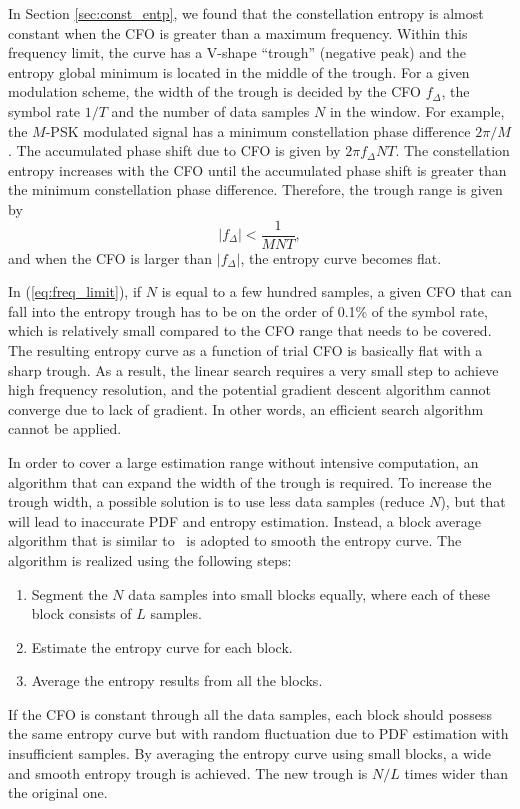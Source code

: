 \documentclass[journal,comsoc, onecolumn, 12pt,draftclsnofoot]{IEEEtran} %
\begin{document}
In Section \ref{sec:const_entp}, we found that the constellation entropy is almost constant when the CFO is greater than a maximum frequency.
Within this frequency limit, the curve has a V-shape ``trough'' (negative peak) and the entropy global minimum is located in the middle of the trough.
For a given modulation scheme, the width of the trough is decided by the CFO $f_\Delta$, the symbol rate $1/T$ and the number of data samples $N$ in the window.
For example, the \(M\)-PSK modulated signal has a minimum constellation phase difference \(2\pi/M\).
The accumulated phase shift due to CFO is given by \(2\pi f_\Delta N T\).
The constellation entropy increases with the CFO until the accumulated phase shift is greater than the minimum constellation phase difference. 
Therefore, the trough range is given by
\begin{equation}
\left| {f_\Delta } \right| < \frac{1}{{MNT}},
\label{eq:freq_limit}
\end{equation}
\noindent and when the CFO is larger than $\left| {f_\Delta } \right|$, the entropy curve becomes flat.


In (\ref{eq:freq_limit}), if \(N\) is equal to a few hundred samples, a given CFO that can fall into the entropy trough has to be on the order of 0.1\% of the symbol rate, which is relatively small compared to the CFO range that needs to be covered.
The resulting entropy curve as a function of trial CFO is basically flat with a sharp trough.
As a result, the linear search requires a very small step to achieve high frequency resolution, and the potential gradient descent algorithm cannot converge due to lack of gradient.
In other words, an efficient search algorithm cannot be applied. 

In order to cover a large estimation range without intensive computation, an algorithm that can expand the width of the trough is required.
To increase the trough width, a possible solution is to use less data samples (reduce \(N\)), but that will lead to inaccurate PDF and entropy estimation.
Instead, a block average algorithm that is similar to~\cite{YuanlingHuang2007} is adopted to smooth the entropy curve. The algorithm is realized using the following steps:

\begin{enumerate}
\item Segment the \(N\) data samples into small blocks equally, where each of these block consists of \(L\) samples. 
\item Estimate the entropy curve for each block.
\item Average the entropy results from all the blocks.
\end{enumerate}
If the CFO is constant through all the data samples, each block should possess the same entropy curve but with random fluctuation due to PDF estimation with insufficient samples.
By averaging the entropy curve using small blocks, a wide and smooth entropy trough is achieved.
The new trough is $N/L$ times wider than the original one.
\end{document}
